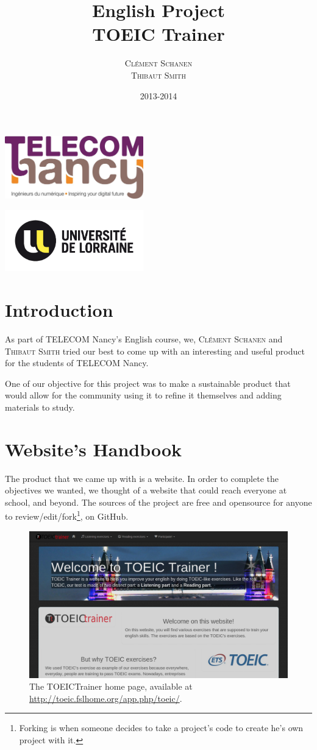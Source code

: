 \documentclass[12pt,a4paper]{report}
\title{English Project \\ \textbf{TOEIC Trainer}}
\author{\textsc{Clément Schanen} \\ \textsc{Thibaut Smith}}
\date{2013-2014}
\makeatletter
\def\maketitle{
\begin{minipage}{0.54\textwidth}
\begin{flushleft} \large
\LARGE \@author
\end{flushleft}
\end{minipage}
\begin{minipage}{0.4\textwidth}
\begin{flushright} \large
\end{flushright}
\end{minipage}
  \vfill
  \begin{center}\leavevmode
    \normalfont
    {\LARGE \@title\par}%
    {\Large \@date\par}
    \vskip 1cm
  \end{center}%
  \vfill
  \hfill
  
\begin{minipage}{0.54\textwidth}
\begin{flushleft} \large
\includegraphics[width=6cm]{telecomnancy.jpg}


\end{flushleft}
\end{minipage}
\begin{minipage}{0.4\textwidth}
\begin{flushright} \large
\includegraphics[width=6cm]{univ-lorraine.jpg}
\end{flushright}
\end{minipage}
  \cleardoublepage
  }
\makeatother
\begin{document}
\pagestyle{empty} %

\maketitle %

\pagestyle{plain}
\setcounter{page}{2}

\tableofcontents
\section*{Introduction}
As part of TELECOM Nancy's English course, we, \textsc{Clément Schanen} and
\textsc{Thibaut Smith} tried our best to come up with an interesting and
useful product for the students of TELECOM Nancy.

One of our objective for this project was to make a sustainable product that
would allow for the community using it to refine it themselves and adding
materials to study.

\pagebreak
\section{Website's Handbook}

The product that we came up with is a website\cite{TOEICTrainer}. In order to
complete the objectives we wanted, we thought of a website that could reach
everyone at school, and beyond. The sources of the project are free and
opensource for anyone to review/edit/fork\footnote{Forking is when someone
decides to take a project's code to create he's own project with it.}, on
GitHub\cite{github_tc}.

\begin{figure}[here]
\includegraphics[scale=0.35]{homepage.png}
\caption{The TOEICTrainer home page\cite{TOEICTrainer}, available at \url{http://toeic.fslhome.org/app.php/toeic/}.}
\label{homepage}
\end{figure}
\end{document}
